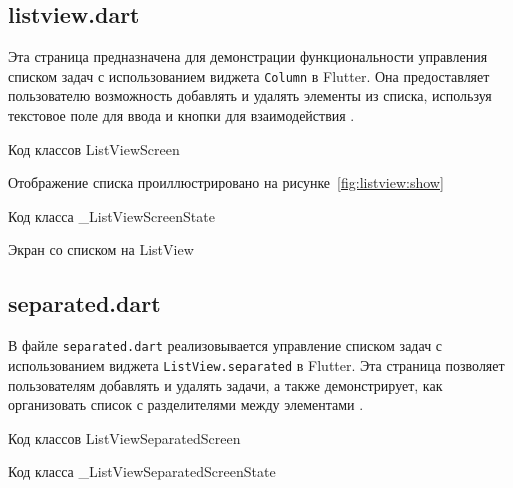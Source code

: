 \subsection{listview.dart}

Эта страница предназначена для демонстрации функциональности управления
списком задач с использованием виджета \texttt{Column} в Flutter.
Она предоставляет пользователю возможность добавлять
и удалять элементы из списка, используя текстовое поле для ввода
и кнопки для взаимодействия .

\begin{image}
	\caption{Код классов ListViewScreen}
	\label{fig:lst:listview}
\end{image}

Отображение списка проиллюстрировано на рисунке~\ref{fig:listview:show}

\begin{image}
	\caption{Код класса \_ListViewScreenState}
	\label{fig:lst:listview:state}
\end{image}

\begin{image}
	\caption{Экран со списком на ListView}
	\label{fig:listview:show}
\end{image}

\clearpage

\subsection{separated.dart}

В файле \texttt{separated.dart} реализовывается управление списком задач
с использованием виджета \texttt{ListView.separated} в Flutter.
Эта страница позволяет пользователям добавлять и удалять задачи,
а также демонстрирует,
как организовать список с разделителями между элементами
.

\begin{image}
	\caption{Код классов ListViewSeparatedScreen}
	\label{fig:lst:listview:sep}
\end{image}

\begin{image}
	\caption{Код класса \_ListViewSeparatedScreenState}
	\label{fig:lst:listview:sep:state}
\end{image}

